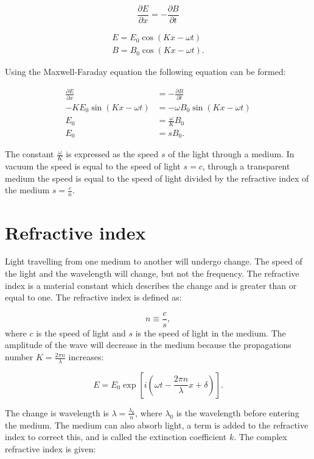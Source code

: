 \documentclass[MasterThesisMain.tex]{subfiles}
\begin{document}
\begin{equation}
\frac{\partial E}{\partial x} = - \frac{\partial B}{\partial t}
\end{equation}

\begin{align}
E = E_0 \cos{(Kx-\omega t)}\\
B = B_0 \cos{(Kx-\omega t)}.
\end{align}

Using the Maxwell-Faraday equation the following equation can be formed:

\begin{align}
\frac{\partial E}{\partial x} &= - \frac{\partial B}{\partial t}\\
-K E_0 \sin{(Kx-\omega t)} &= -\omega B_0 \sin{(Kx-\omega t)}\\
E_0 &= \frac{\omega}{K} B_0\\
E_0 &= s B_0.
\end{align} 

The constant $\frac{\omega}{K}$ is expressed as the speed $s$ of the light through a medium. In vacuum the speed is equal to the speed of light $s=c$, through a transparent medium the speed is equal to the speed of light divided by the refractive index of the medium $s =\frac{c}{n}$. 

\section{Refractive index} 
Light travelling from one medium to another will undergo change. The speed of the light and the wavelength will change, but not the frequency. The refractive index is a material constant which describes the change and is greater than or equal to one. The refractive index is defined as:

\begin{equation}
n \equiv \frac{c}{s},
\end{equation}
where $c$ is the speed of light and $s$ is the speed of light in the medium. The amplitude of the wave will decrease in the medium because the propagations number $K=\frac{2\pi n}{\lambda}$ increases: 

\begin{equation}
E = E_0\exp[i(\omega t - \frac{2\pi n}{\lambda}x + \delta)]\label{eq:daE}.
\end{equation}

The change is wavelength is $\lambda = \frac{\lambda_0}{n}$, where $\lambda_0$ is the wavelength before entering the medium. The medium can also absorb light, a term is added to the refractive index to correct this, and is called the extinction coefficient $k$. The complex refractive index is given:
\end{document}
